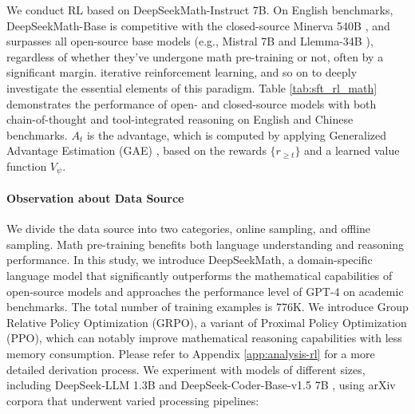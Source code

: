 \begin{itemize}[topsep=0pt]
\begin{itemize}[topsep=0pt]
We conduct RL based on DeepSeekMath-Instruct 7B. On English benchmarks, DeepSeekMath-Base is competitive with the closed-source Minerva 540B \citep{minerva}, and surpasses all open-source base models (e.g., Mistral 7B \citep{mistral} and Llemma-34B \citep{llemma}), regardless of whether they've undergone math pre-training or not, often by a significant margin. iterative reinforcement learning, and so on to deeply investigate the essential elements of this paradigm. Table \ref{tab:sft_rl_math} demonstrates the performance of open- and closed-source models with both chain-of-thought and tool-integrated reasoning on English and Chinese benchmarks. $A_t$  is the advantage, which is computed by applying Generalized Advantage Estimation (GAE) \citep{gae}, based on the rewards  $\{r_{\ge t}\}$  and a learned value function  $V_{\psi}$. \paragraph{Observation about Data Source} We divide the data source into two categories, online sampling, and offline sampling. Math pre-training benefits both language understanding and reasoning performance. In this study, we introduce DeepSeekMath, a domain-specific language model that significantly outperforms the mathematical capabilities of open-source models and approaches the performance level of GPT-4 on academic benchmarks. The total number of training examples is 776K. We introduce Group Relative Policy Optimization (GRPO), a variant of Proximal Policy Optimization (PPO), which can notably improve mathematical reasoning capabilities with less memory consumption. Please refer to Appendix \ref{app:analysis-rl} for a more detailed derivation process. We experiment with models of different sizes, including DeepSeek-LLM 1.3B and DeepSeek-Coder-Base-v1.5 7B \citep{deepseek-coder}, using arXiv corpora that underwent varied processing pipelines:


\end{itemize}
\end{itemize}
